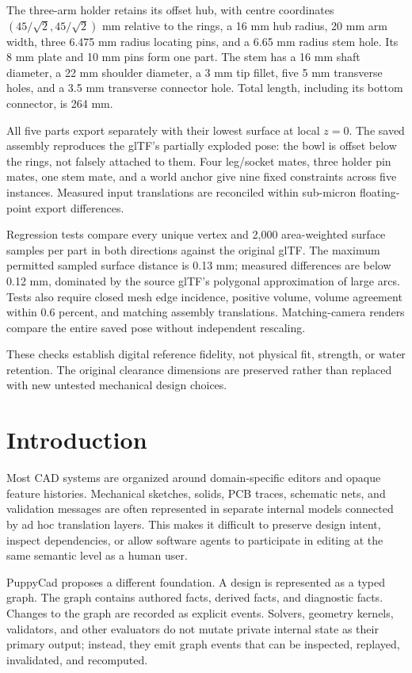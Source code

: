 \documentclass[11pt]{article}
\begin{document}
The three-arm holder retains its offset hub, with centre coordinates
$(45/\sqrt{2},45/\sqrt{2})$ mm relative to the rings, a 16 mm hub radius,
20 mm arm width, three 6.475 mm radius locating pins, and a 6.65 mm radius stem
hole. Its 8 mm plate and 10 mm pins form one part. The stem has a 16 mm shaft
diameter, a 22 mm shoulder diameter, a 3 mm tip fillet, five 5 mm transverse holes,
and a 3.5 mm transverse connector hole. Total length, including its bottom
connector, is 264 mm.

All five parts export separately with their lowest surface at local $z=0$.
The saved assembly reproduces the glTF's partially exploded pose: the bowl is
offset below the rings, not falsely attached to them. Four leg/socket mates,
three holder pin mates, one stem mate, and a world anchor give nine fixed
constraints across five instances. Measured input translations are reconciled
within sub-micron floating-point export differences.

Regression tests compare every unique vertex and 2,000 area-weighted surface
samples per part in both directions against the original glTF. The maximum
permitted sampled surface distance is 0.13 mm; measured differences are below
0.12 mm, dominated by the source glTF's polygonal approximation of large arcs.
Tests also require closed mesh edge incidence, positive volume, volume agreement
within 0.6 percent, and matching assembly translations. Matching-camera renders
compare the entire saved pose without independent rescaling.

These checks establish digital reference fidelity, not physical fit, strength,
or water retention. The original clearance dimensions are preserved rather than
replaced with new untested mechanical design choices.

\section{Introduction}

Most CAD systems are organized around domain-specific editors and opaque feature histories. Mechanical sketches, solids, PCB traces, schematic nets, and validation messages are often represented in separate internal models connected by ad hoc translation layers. This makes it difficult to preserve design intent, inspect dependencies, or allow software agents to participate in editing at the same semantic level as a human user.

PuppyCad proposes a different foundation. A design is represented as a typed graph. The graph contains authored facts, derived facts, and diagnostic facts. Changes to the graph are recorded as explicit events. Solvers, geometry kernels, validators, and other evaluators do not mutate private internal state as their primary output; instead, they emit graph events that can be inspected, replayed, invalidated, and recomputed.
\end{document}
